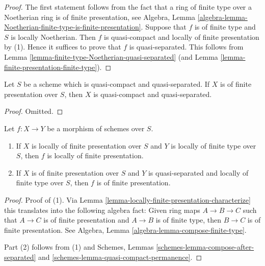 \begin{proof}
The first statement follows from the fact that a ring
of finite type over a Noetherian ring is of finite presentation, see Algebra,
Lemma \ref{algebra-lemma-Noetherian-finite-type-is-finite-presentation}.
Suppose that $f$ is of finite type and $S$ is locally Noetherian.
Then $f$ is quasi-compact and locally of finite presentation by (1).
Hence it suffices to prove that $f$ is quasi-separated.
This follows from Lemma \ref{lemma-finite-type-Noetherian-quasi-separated}
(and Lemma \ref{lemma-finite-presentation-finite-type}).
\end{proof}

\begin{lemma}
\label{lemma-finite-presentation-quasi-compact-quasi-separated}
Let $S$ be a scheme which is quasi-compact and quasi-separated.
If $X$ is of finite presentation over $S$, then $X$ is quasi-compact
and quasi-separated.
\end{lemma}

\begin{proof}
Omitted.
\end{proof}

\begin{lemma}
\label{lemma-finite-presentation-permanence}
Let $f : X \to Y$ be a morphism of schemes over $S$.
\begin{enumerate}
\item If $X$ is locally of finite presentation over $S$ and
$Y$ is locally of finite type over $S$, then $f$ is locally
of finite presentation.
\item If $X$ is of finite presentation over $S$ and $Y$ is quasi-separated
and locally of finite type over $S$, then $f$ is of finite presentation.
\end{enumerate}
\end{lemma}

\begin{proof}
Proof of (1). Via Lemma \ref{lemma-locally-finite-presentation-characterize}
this translates into the following algebra
fact: Given ring maps $A \to B \to C$ such that $A \to C$ is
of finite presentation and $A \to B$ is of finite type,
then $B \to C$ is of finite presentation. See
Algebra, Lemma \ref{algebra-lemma-compose-finite-type}.

\medskip\noindent
Part (2) follows from (1) and
Schemes, Lemmas \ref{schemes-lemma-compose-after-separated} and
\ref{schemes-lemma-quasi-compact-permanence}.
\end{proof}

